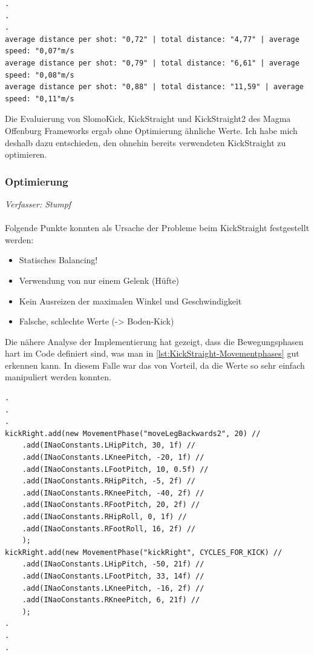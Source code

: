 \documentclass[fontsize=12pt,a4paper,final]{scrartcl}[2003/01/01]
\begin{document}
\begin{lstlisting}[caption=Kick Metrik Konsolenausgabe, captionpos=b, label=lst:KickMetricConsoleOutput]
.
.
.
average distance per shot: "0,72" | total distance: "4,77" | average speed: "0,07"m/s
average distance per shot: "0,79" | total distance: "6,61" | average speed: "0,08"m/s
average distance per shot: "0,88" | total distance: "11,59" | average speed: "0,11"m/s
\end{lstlisting}

Die Evaluierung von SlomoKick, KickStraight und KickStraight2 des Magma Offenburg Frameworks ergab ohne Optimierung ähnliche Werte. Ich habe mich deshalb dazu entschieden, den ohnehin bereits verwendeten KickStraight zu optimieren.

\subsubsection{Optimierung}
\textit{Verfasser: Stumpf}\\
\\
Folgende Punkte konnten als Ursache der Probleme beim KickStraight festgestellt werden:
\begin{itemize}
\item Statisches Balancing!
\item Verwendung von nur einem Gelenk (Hüfte)
\item Kein Ausreizen der maximalen Winkel und Geschwindigkeit
\item Falsche, schlechte Werte (-> Boden-Kick)
\end{itemize}

Die nähere Analyse der Implementierung hat gezeigt, dass die Bewegungsphasen hart im Code definiert sind, was man in \autoref{lst:KickStraight-Movementphases} gut erkennen kann. In diesem Falle war das von Vorteil, da die Werte so sehr einfach manipuliert werden konnten.

\begin{lstlisting}[caption=KickStraight Bewegungsphasen, captionpos=b, label=lst:KickStraight-Movementphases]
.
.
.
kickRight.add(new MovementPhase("moveLegBackwards2", 20) //
	.add(INaoConstants.LHipPitch, 30, 1f) //
	.add(INaoConstants.LKneePitch, -20, 1f) //
	.add(INaoConstants.LFootPitch, 10, 0.5f) //
	.add(INaoConstants.RHipPitch, -5, 2f) //
	.add(INaoConstants.RKneePitch, -40, 2f) //
	.add(INaoConstants.RFootPitch, 20, 2f) //
	.add(INaoConstants.RHipRoll, 0, 1f) //
	.add(INaoConstants.RFootRoll, 16, 2f) //
	);
kickRight.add(new MovementPhase("kickRight", CYCLES_FOR_KICK) //
	.add(INaoConstants.LHipPitch, -50, 21f) // 
	.add(INaoConstants.LFootPitch, 33, 14f) // 
	.add(INaoConstants.LKneePitch, -16, 2f) // 
	.add(INaoConstants.RKneePitch, 6, 21f) // 
	);
.
.
.
\end{lstlisting}
\end{document}
